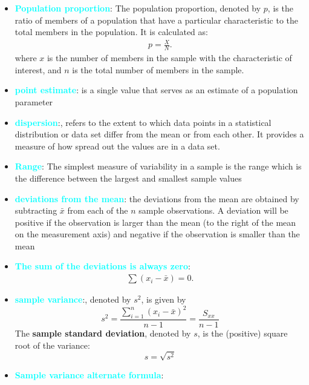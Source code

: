 \documentclass{report}
\begin{document}
\begin{itemize}
        \item \textbf{\textcolor{cyan}{Population proportion}}: The population proportion, denoted by \( p \), is the ratio of members of a population that have a particular characteristic to the total members in the population. It is calculated as:
            \begin{align*}
                p = \frac{X}{N}
            .\end{align*}
            where \( x \) is the number of members in the sample with the characteristic of interest, and \( n \) is the total number of members in the sample.
        \item \textbf{\textcolor{cyan}{point estimate}}: is a single value that serves as an estimate of a population parameter
        \item \textbf{\textcolor{cyan}{dispersion}}:, refers to the extent to which data points in a statistical distribution or data set differ from the mean or from each other. It provides a measure of how spread out the values are in a data set.
        \item \textbf{\textcolor{cyan}{Range}}: The simplest measure of variability in a sample is the range which is the difference
            between the largest and smallest sample values
        \item \textbf{\textcolor{cyan}{deviations from the mean}}:
            the deviations from the mean are obtained by
            subtracting $\bar{x}$ from each of the $n $ sample observations. A deviation will be positive if
            the observation is larger than the mean (to the right of the mean on the measurement
            axis) and negative if the observation is smaller than the mean
        \item \textbf{\textcolor{cyan}{The sum of the deviations is always zero}}:
            \begin{align*}
                \sum (x_{i} - \bar{x}) = 0
            .\end{align*}
        \item \textbf{\textcolor{cyan}{sample variance}}:, denoted by \( s^2 \), is given by
            \[
                s^2 = \frac{\sum_{i=1}^{n} (x_i - \bar{x})^2}{n - 1} = \frac{S_{xx}}{n - 1}
            \]
            The \textbf{sample standard deviation}, denoted by \( s \), is the (positive) square root of the variance:
            \[
                s = \sqrt{s^2}
            \]
        \item \textbf{\textcolor{cyan}{Sample variance alternate formula}}:
            \begin{align*}

\end{align*}
\end{itemize}
\end{document}
